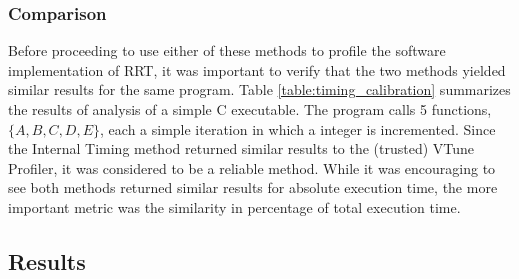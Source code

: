 
    \subsubsection{Comparison}
        Before proceeding to use either of these methods to profile the software implementation of \ac{RRT}, it was important to verify that the two methods yielded similar results for the same program. Table \ref{table:timing_calibration} summarizes the results of analysis of a simple C executable. The program calls 5 functions, $\{A, B, C, D, E\}$, each a simple iteration in which a integer is incremented. Since the Internal Timing method returned similar results to the (trusted) VTune Profiler, it was considered to be a reliable method. While it was encouraging to see both methods returned similar results for absolute execution time, the more important metric was the similarity in percentage of total execution time.

        

\subsection{Results}
\label{section:rrt_analysis_results}